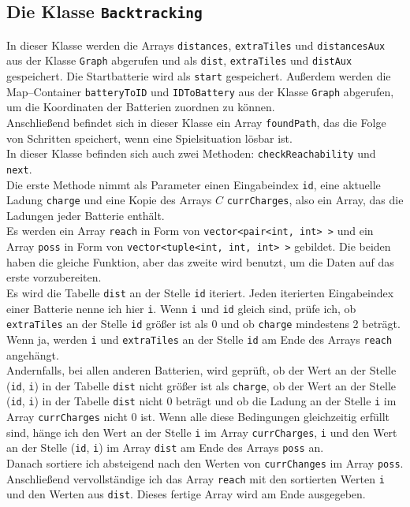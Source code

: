 \documentclass[a4paper,10pt,ngerman]{scrartcl}
\begin{document}
\subsection{Die Klasse \texttt{Backtracking}}
In dieser Klasse werden die Arrays \texttt{distances}, \texttt{extraTiles} und \texttt{distancesAux}
aus der Klasse \texttt{Graph} abgerufen und als \texttt{dist}, \texttt{extraTiles} und \texttt{distAux} gespeichert.
Die Startbatterie wird als \texttt{start} gespeichert. Außerdem werden die Map--Container \texttt{batteryToID}
und \texttt{IDToBattery} aus der Klasse \texttt{Graph} abgerufen, um die Koordinaten der Batterien zuordnen zu können.\\
Anschließend befindet sich in dieser Klasse ein Array \texttt{foundPath}, das die Folge von Schritten speichert,
wenn eine Spielsituation lösbar ist.\\
In dieser Klasse befinden sich auch zwei Methoden: \texttt{checkReachability} und \texttt{next}.\\

Die erste Methode nimmt als Parameter einen Eingabeindex \texttt{id}, eine aktuelle Ladung \texttt{charge}
und eine Kopie des Arrays $C$ \texttt{currCharges}, also ein Array, das die Ladungen jeder Batterie enthält.\\
Es werden ein Array \texttt{reach} in Form von \texttt{vector<pair<int, int> >} und ein Array \texttt{poss} in
Form von \texttt{vector<tuple<int, int, int> >} gebildet. Die beiden haben die gleiche Funktion, aber 
das zweite wird benutzt, um die Daten auf das erste vorzubereiten.\\
Es wird die Tabelle \texttt{dist} an der Stelle \texttt{id} iteriert. Jeden iterierten Eingabeindex
einer Batterie nenne ich hier \texttt{i}.
Wenn \texttt{i} und \texttt{id} gleich sind, prüfe ich, ob \texttt{extraTiles} an der Stelle \texttt{id}
größer ist als 0 und ob \texttt{charge} mindestens 2 beträgt. Wenn ja, werden \texttt{i} und \texttt{extraTiles}
an der Stelle \texttt{id} am Ende des Arrays \texttt{reach} angehängt.\\
Andernfalls, bei allen anderen Batterien, wird geprüft, ob der Wert an der Stelle (\texttt{id}, \texttt{i}) in der Tabelle
\texttt{dist} nicht größer ist als \texttt{charge}, ob der Wert an der Stelle (\texttt{id}, \texttt{i}) in der Tabelle
\texttt{dist} nicht 0 beträgt und ob die Ladung an der Stelle \texttt{i} im Array \texttt{currCharges} nicht 0 ist.
Wenn alle diese Bedingungen gleichzeitig erfüllt sind, hänge ich den Wert an der Stelle \texttt{i} im Array \texttt{currCharges},
\texttt{i} und den Wert an der Stelle (\texttt{id}, \texttt{i}) im Array \texttt{dist} am Ende des Arrays \texttt{poss} an.\\
Danach sortiere ich absteigend nach den Werten von \texttt{currChanges} im Array \texttt{poss}. 
Anschließend vervollständige ich das Array \texttt{reach} mit den sortierten Werten \texttt{i} und den Werten aus \texttt{dist}.
Dieses fertige Array wird am Ende ausgegeben.\\
\end{document}
